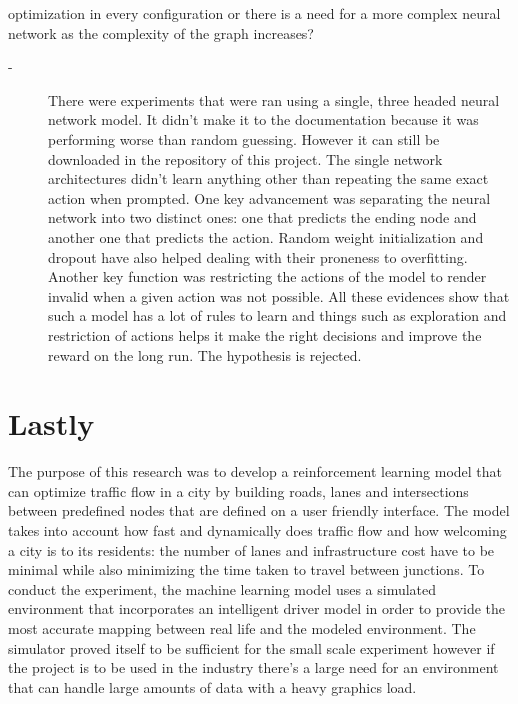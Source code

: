 \documentclass[
]{elteikthesis}[2023/04/10]
\begin{document}
\begin{enumerate}
optimization in every configuration or there is a need for a more
complex neural network as the complexity of the graph increases? 
\begin{description}
\item [{-}] There were experiments that were ran using a single, three
headed neural network model. It didn't make it to the documentation
because it was performing worse than random guessing. However it can
still be downloaded in the repository of this project. The single
network architectures didn't learn anything other than repeating the
same exact action when prompted. One key advancement was separating
the neural network into two distinct ones: one that predicts the ending
node and another one that predicts the action. Random weight initialization
and dropout have also helped dealing with their proneness to overfitting.
Another key function was restricting the actions of the model to render
invalid when a given action was not possible. All these evidences
show that such a model has a lot of rules to learn and things such
as exploration and restriction of actions helps it make the right
decisions and improve the reward on the long run. The hypothesis is
rejected.
\end{description}
\end{enumerate}

\section*{Lastly}

The purpose of this research was to develop a reinforcement learning
model that can optimize traffic flow in a city by building roads,
lanes and intersections between predefined nodes that are defined
on a user friendly interface. The model takes into account how
fast and dynamically does traffic flow and how welcoming a city is
to its residents: the number of lanes and infrastructure cost have
to be minimal while also minimizing the time taken to travel between
junctions. To conduct the experiment, the machine learning model uses
a simulated environment that incorporates an intelligent driver model
in order to provide the most accurate mapping between real life and
the modeled environment. The simulator proved itself to be sufficient
for the small scale experiment however if the project is to be used
in the industry there's a large need for an environment that can handle
large amounts of data with a heavy graphics load.
\end{document}
